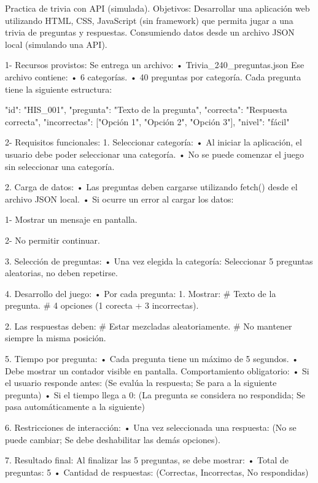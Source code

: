 Practica de trivia con API (simulada).
Objetivos: Desarrollar una aplicación web utilizando HTML, CSS, JavaScript (sin framework) que permita jugar a una trivia de preguntas y respuestas. 
Consumiendo datos desde un archivo JSON local (simulando una API).

1- Recursos provistos:
Se entrega un archivo: 
    •	Trivia_240_preguntas.json
Ese archivo contiene:
    •	6 categorías.
    •	40 preguntas por categoría.
Cada pregunta tiene la siguiente estructura:

{
"id": "HIS_001",
"pregunta": "Texto de la pregunta",
"correcta": "Respuesta correcta",
"incorrectas": ["Opción 1", "Opción 2", "Opción 3"],
"nivel": "fácil"
}

2- Requisitos funcionales:
1.	Seleccionar categoría:
    •	Al iniciar la aplicación, el usuario debe poder seleccionar una categoría.
    •	No se puede comenzar el juego sin seleccionar una categoría.

2.	Carga de datos:
    •	Las preguntas deben cargarse utilizando fetch() desde el archivo JSON local.
    •	Si ocurre un error al cargar los datos:

1-	Mostrar un mensaje en pantalla.

2-	No permitir continuar.

3.	Selección de preguntas:
•	Una vez elegida la categoría:
    Seleccionar 5 preguntas aleatorias, no deben repetirse.

4.	Desarrollo del juego:
•	Por cada pregunta:
    1.	Mostrar: 
             # Texto de la pregunta.
             # 4 opciones (1 corecta + 3 incorrectas).

    2.	Las respuestas deben:
             # Estar mezcladas aleatoriamente.
             # No mantener siempre la misma posición.


5.	Tiempo por pregunta:
    •	Cada pregunta tiene un máximo de 5 segundos.
    •	Debe mostrar un contador visible en pantalla.
   Comportamiento obligatorio:
            •	Si el usuario responde antes: (Se evalúa la respuesta; Se para a la siguiente pregunta)
            •	Si el tiempo llega a 0: (La pregunta se considera no respondida; Se pasa automáticamente a la siguiente)

6.	Restricciones de interacción:
•	Una vez seleccionada una respuesta: (No se puede cambiar; Se debe deshabilitar las demás opciones).

7.	Resultado final: Al finalizar las 5 preguntas, se debe mostrar:
•	Total de preguntas: 5
•	Cantidad de respuestas: (Correctas, Incorrectas, No respondidas)

